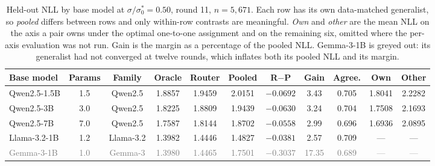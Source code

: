 \documentclass{article}
\begin{document}
\begin{table}[t]
\centering
\caption{Held-out NLL by base model at $\sigma/\sigma_0^*=0.50$, round 11, $n=5{,}671$. Each row has
its own data-matched generalist, so \emph{pooled} differs between rows and only within-row contrasts
are meaningful. \emph{Own} and \emph{other} are the mean NLL on the axis a pair owns under the
optimal one-to-one assignment and on the remaining six, omitted where the per-axis evaluation was not
run. Gain is the margin as a percentage of the pooled NLL. Gemma-3-1B is greyed out: its generalist had not converged at twelve rounds, which inflates both
its pooled NLL and its margin.}
\label{tab:scaledetail}
\footnotesize
\setlength{\tabcolsep}{3pt}
\begin{tabular}{lcccccccccc}
\toprule
Base model & Params & Family & Oracle & Router & Pooled & R$-$P & Gain & Agree. & Own & Other \\
\midrule
Qwen2.5-1.5B & 1.5 & Qwen2.5 & 1.8857 & 1.9459 & 2.0151 & $-0.0692$ & 3.43 & 0.705 & 1.8041 & 2.2282 \\
Qwen2.5-3B & 3.0 & Qwen2.5 & 1.8225 & 1.8809 & 1.9439 & $-0.0630$ & 3.24 & 0.704 & 1.7508 & 2.1693 \\
Qwen2.5-7B & 7.0 & Qwen2.5 & 1.7587 & 1.8144 & 1.8702 & $-0.0558$ & 2.99 & 0.696 & 1.6936 & 2.0895 \\
Llama-3.2-1B & 1.2 & Llama-3.2 & 1.3982 & 1.4446 & 1.4827 & $-0.0381$ & 2.57 & 0.709 & --- & --- \\
\midrule
\textcolor{gray}{Gemma-3-1B} & \textcolor{gray}{1.0} & \textcolor{gray}{Gemma-3} & \textcolor{gray}{1.3980} & \textcolor{gray}{1.4465} & \textcolor{gray}{1.7501} & \textcolor{gray}{$-0.3037$} & \textcolor{gray}{17.35} & \textcolor{gray}{0.689} & \textcolor{gray}{---} & \textcolor{gray}{---} \\
\bottomrule
\end{tabular}
\end{table}



\end{document}
